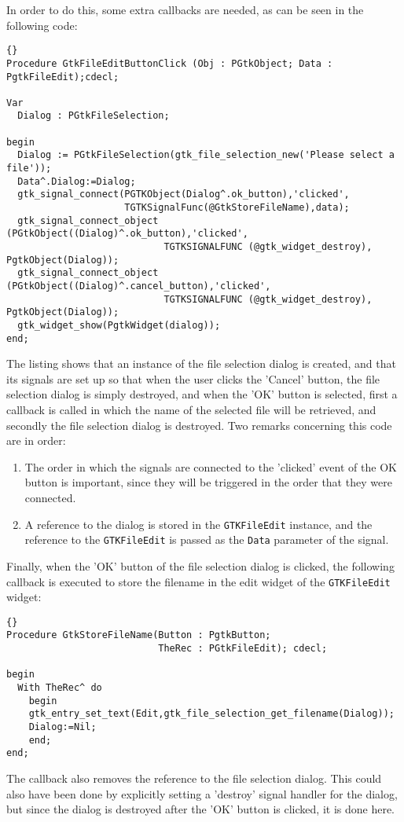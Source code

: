 \documentclass[10pt]{article}
\begin{document}
In order to do this, some extra callbacks are needed, as can be seen in the
following code:
\begin{lstlisting}{}
Procedure GtkFileEditButtonClick (Obj : PGtkObject; Data : PgtkFileEdit);cdecl;

Var
  Dialog : PGtkFileSelection;
  
begin
  Dialog := PGtkFileSelection(gtk_file_selection_new('Please select a file'));
  Data^.Dialog:=Dialog;
  gtk_signal_connect(PGTKObject(Dialog^.ok_button),'clicked',
                     TGTKSignalFunc(@GtkStoreFileName),data);
  gtk_signal_connect_object (PGtkObject((Dialog)^.ok_button),'clicked', 
                            TGTKSIGNALFUNC (@gtk_widget_destroy), PgtkObject(Dialog));
  gtk_signal_connect_object (PGtkObject((Dialog)^.cancel_button),'clicked', 
                            TGTKSIGNALFUNC (@gtk_widget_destroy), PgtkObject(Dialog));
  gtk_widget_show(PgtkWidget(dialog));
end;
\end{lstlisting}
The listing shows that an instance of the file selection dialog is created,
and that its signals are set up so that when the user clicks the 'Cancel'
button, the file selection dialog is simply destroyed, and when the 'OK'
button is selected, first a callback is called in which the name of the
selected file will be retrieved, and secondly the file selection dialog
is destroyed. 
Two remarks concerning this code are in order:
\begin{enumerate}
\item The order in which the signals are connected to the 'clicked' event of 
the OK button is important, since they will be triggered in the order that
they were connected.
\item A reference to the dialog is stored in the \lstinline|GTKFileEdit|
instance, and the reference to the \lstinline|GTKFileEdit| is passed as the
\lstinline|Data| parameter of the signal. 
\end{enumerate}
Finally, when the 'OK' button of the file selection dialog is clicked, the
following callback is executed to store the filename in the edit widget of
the \lstinline|GTKFileEdit| widget:
\begin{lstlisting}{}
Procedure GtkStoreFileName(Button : PgtkButton; 
                           TheRec : PGtkFileEdit); cdecl;

begin
  With TheRec^ do 
    begin
    gtk_entry_set_text(Edit,gtk_file_selection_get_filename(Dialog));
    Dialog:=Nil;
    end;
end;
\end{lstlisting}
The callback also removes the reference to the file selection dialog. This
could also have been done by explicitly setting a 'destroy' signal handler
for the dialog, but since the dialog is destroyed after the 'OK' button is 
clicked, it is done here.
\end{document}
